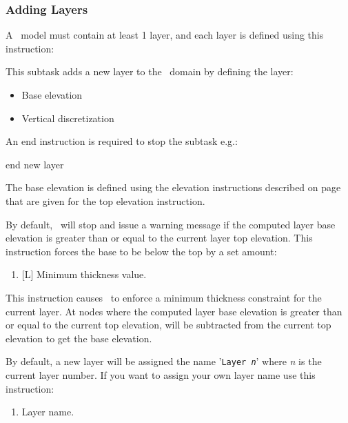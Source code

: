 \subsubsection{Adding Layers} 
A \mfus\ model must contain at least 1 layer, and each layer is defined using this instruction:     {

    {This subtask adds a new layer to the \gwf\ domain by defining the layer:
     \begin{itemize}
       \item Base elevation
       \item Vertical discretization
     \end{itemize}

    An end instruction is required to stop the subtask e.g.:

    {\Large \sf end new layer}
    }

The base elevation is defined using the elevation instructions  described on page~\pageref{'Page:TopElev'} that are given for the \textsf{top elevation} instruction.

By default, \mut\ will stop and issue a warning message if the computed layer base elevation is greater than or equal to the current layer top elevation.  This instruction forces the base to be below the top by a set amount:

    {\squish
    \begin{enumerate}
    \item {}[L]  Minimum thickness value.
    \end{enumerate}
    This instruction causes \mut\ to enforce a minimum thickness constraint for the current layer. At nodes where the computed layer base elevation is greater than or equal to the current top elevation,  will
    be subtracted from the current top elevation to get the base elevation.
    }


By default, a new layer will be assigned the name '\texttt{Layer {\em n}}' where {\em n} is the current layer number.  If you want to assign your own layer name use this instruction:

    {
    \squish
    \begin{enumerate}
    \item {} Layer name.
    \end{enumerate}
    }


}
